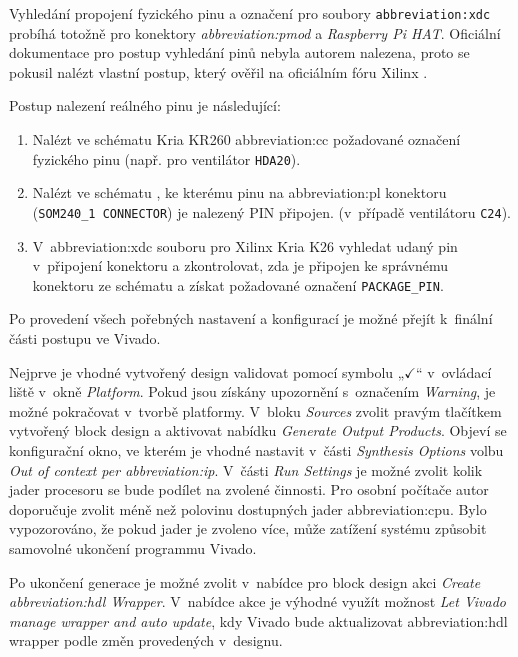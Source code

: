 \documentclass[a4paper, twoside, 11pt]{article}
\newcommand{\fbar}{\FloatBarrier}
\begin{document}
				Vyhledání propojení fyzického pinu a označení pro soubory \texttt{\gls{abbreviation:xdc}} probíhá totožně pro konektory \textit{\gls{abbreviation:pmod}} a \textit{Raspberry Pi HAT}. Oficiální dokumentace pro postup vyhledání pinů nebyla autorem nalezena, proto se pokusil nalézt vlastní postup, který ověřil na oficiálním fóru Xilinx \cite{xilinx-support-forum-petrzakopal-schematic-vs-constrains-pin-confusion-explanation}.\par
				\vspace*{0.55cm}
				Postup nalezení reálného pinu je následující:
				\begin{enumerate}
					\item Nalézt ve schématu \cite{kria-kr260-starter-kit-cc-schematics} Kria KR260 \gls{abbreviation:cc} požadované označení fyzického pinu (např. pro ventilátor \texttt{HDA20}).
					\item Nalézt ve schématu \cite{kria-kr260-starter-kit-cc-schematics}, ke kterému pinu na \gls{abbreviation:pl} konektoru (\texttt{SOM240\_1 CONNECTOR}) je nalezený PIN připojen. (v~případě ventilátoru \texttt{C24}).
					\item V~\gls{abbreviation:xdc} \cite{kria-k26-som-xdc} souboru pro Xilinx Kria K26 vyhledat udaný pin v~připojení konektoru a zkontrolovat, zda je připojen ke správnému konektoru ze schématu a získat požadované označení \texttt{PACKAGE\_PIN}.
				\end{enumerate}
				\vspace*{0.75cm}
				\fbar
				Po provedení všech pořebných nastavení a konfigurací je možné přejít k~finální části postupu ve Vivado.\par
				Nejprve je vhodné vytvořený design validovat pomocí symbolu „$\checkmark$“ v~ovládací liště v~okně \textit{Platform}. Pokud jsou získány upozornění s~označením \textit{Warning}, je možné pokračovat v~tvorbě platformy. V~bloku \textit{Sources} zvolit pravým tlačítkem vytvořený block design a aktivovat nabídku \textit{Generate Output Products}. Objeví se konfigurační okno, ve kterém je vhodné nastavit v~části \textit{Synthesis Options} volbu \textit{Out of context per \gls{abbreviation:ip}}. V~části \textit{Run Settings} je možné zvolit kolik jader procesoru se bude podílet na zvolené činnosti. Pro osobní počítače autor doporučuje zvolit méně než polovinu dostupných jader \gls{abbreviation:cpu}. Bylo vypozorováno, že pokud jader je zvoleno více, může zatížení systému způsobit samovolné ukončení programmu Vivado.\par
				Po ukončení generace je možné zvolit v~nabídce pro block design akci \textit{Create \gls{abbreviation:hdl} Wrapper}. V~nabídce akce je výhodné využít možnost \textit{Let Vivado manage wrapper and auto update}, kdy Vivado bude aktualizovat \gls{abbreviation:hdl} wrapper podle změn provedených v~designu.\par
\end{document}
